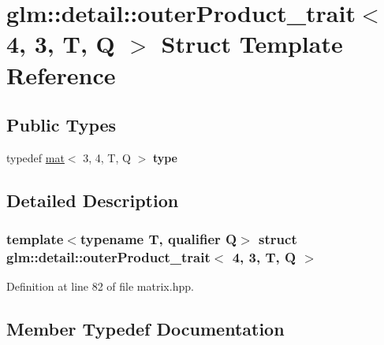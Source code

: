 \hypertarget{structglm_1_1detail_1_1outerProduct__trait_3_014_00_013_00_01T_00_01Q_01_4}{}\section{glm\+:\+:detail\+:\+:outer\+Product\+\_\+trait$<$ 4, 3, T, Q $>$ Struct Template Reference}
\label{structglm_1_1detail_1_1outerProduct__trait_3_014_00_013_00_01T_00_01Q_01_4}
\subsection*{Public Types}
\begin{DoxyCompactItemize}
\item 
\mbox{\label{structglm_1_1detail_1_1outerProduct__trait_3_014_00_013_00_01T_00_01Q_01_4_ac976110a09c606311b8abe8cb48cb437}} 
typedef \hyperlink{structglm_1_1mat}{mat}$<$ 3, 4, T, Q $>$ {\bfseries type}
\end{DoxyCompactItemize}


\subsection{Detailed Description}
\subsubsection*{template$<$typename T, qualifier Q$>$\newline
struct glm\+::detail\+::outer\+Product\+\_\+trait$<$ 4, 3, T, Q $>$}



Definition at line 82 of file matrix.\+hpp.



\subsection{Member Typedef Documentation}
\mbox{\label{structglm_1_1detail_1_1outerProduct__trait_3_014_00_013_00_01T_00_01Q_01_4_ac976110a09c606311b8abe8cb48cb437}} 
